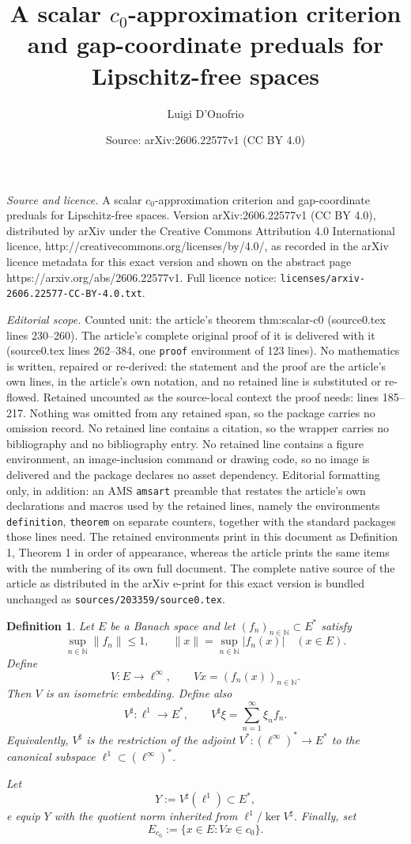 \documentclass[10pt,a4paper]{amsart}
\title{A scalar $c_0$-approximation criterion and gap-coordinate preduals for Lipschitz-free spaces}
\author{Luigi D'Onofrio}
\date{Source: arXiv:2606.22577v1 (CC BY 4.0)}
\newtheorem{definition}{Definition}
\newcommand{\N}{\mathbb N}
\begin{document}
\maketitle

\noindent\emph{Source and licence.} A scalar $c_0$-approximation criterion and gap-coordinate preduals for Lipschitz-free spaces. Version arXiv:2606.22577v1 (CC BY 4.0), distributed by arXiv under the Creative Commons Attribution 4.0 International licence, http://creativecommons.org/licenses/by/4.0/, as recorded in the arXiv licence metadata for this exact version and shown on the abstract page https://arxiv.org/abs/2606.22577v1. Full licence notice: \texttt{licenses/arxiv-2606.22577-CC-BY-4.0.txt}.\par\smallskip

\noindent\textit{Editorial scope.} Counted unit: the article's theorem thm:scalar-c0 (source0.tex lines 230--260). The article's complete original proof of it is delivered with it (source0.tex lines 262--384, one \texttt{proof} environment of 123 lines). No mathematics is written, repaired or re-derived: the statement and the proof are the article's own lines, in the article's own notation, and no retained line is substituted or re-flowed.  Retained uncounted as the source-local context the proof needs: lines 185--217.  Nothing was omitted from any retained span, so the package carries no omission record.  No retained line contains a citation, so the wrapper carries no bibliography and no bibliography entry.  No retained line contains a figure environment, an image-inclusion command or drawing code, so no image is delivered and the package declares no asset dependency.  Editorial formatting only, in addition: an AMS \texttt{amsart} preamble that restates the article's own declarations and macros used by the retained lines, namely the environments \texttt{definition}, \texttt{theorem} on separate counters, together with the standard packages those lines need.  The retained environments print in this document as Definition 1, Theorem 1 in order of appearance, whereas the article prints the same items with the numbering of its own full document.  The complete native source of the article as distributed in the arXiv e-print for this exact version is bundled unchanged as \texttt{sources/203359/source0.tex}.
\begin{definition}\label{def:scalar-setting}
Let $E$ be a Banach space and let $(f_n)_{n\in\N}\subset E^*$ satisfy
\[
        \sup_{n\in\N}\|f_n\|\le 1,
        \qquad
        \|x\|=\sup_{n\in\N}|f_n(x)|\quad (x\in E).
\]
Define
\[
        V:E\longrightarrow \ell^\infty,
        \qquad
        Vx=(f_n(x))_{n\in\N}.
\]
Then $V$ is an isometric embedding. Define also
\[
        V^\sharp:\ell^1\longrightarrow E^*,
        \qquad
        V^\sharp\xi=\sum_{n=1}^\infty \xi_n f_n.
\]
Equivalently, $V^\sharp$ is the restriction of the adjoint
$V^*:(\ell^\infty)^*\to E^*$ to the canonical subspace
$\ell^1\subset (\ell^\infty)^*$.

Let
\[
        Y:=V^\sharp(\ell^1)\subset E^*,
\]
e equip $Y$ with the quotient norm inherited from $\ell^1/\ker V^\sharp$.
Finally, set
\[
        E_{c_0}:=\{x\in E:Vx\in c_0\}.
\]
\end{definition}
\end{document}
